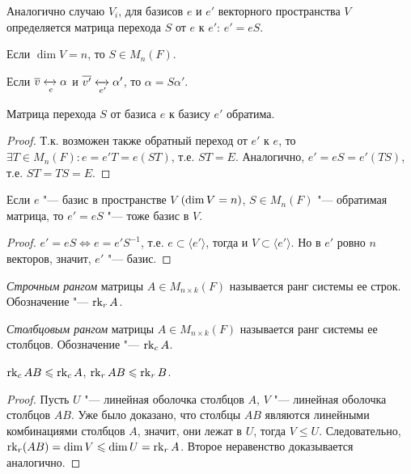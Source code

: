 \begin{note}
	Аналогично случаю $V_i$, для базисов $e$ и $e'$ векторного пространства $V$ определяется матрица перехода $S$ от $e$ к $e'$: $e' = eS$.
	
	Если $\dim{V} = n$, то $S \in M_{n}(F)$.
	
	Если $\overline{v} \xleftrightarrow[e]{} \alpha$ и $\overline{v'} \xleftrightarrow[e']{} \alpha'$, то $\alpha = S\alpha'$.
\end{note}

\begin{proposition}
	Матрица перехода $S$ от базиса $e$ к базису $e'$ обратима.
\end{proposition}

\begin{proof}
	Т.\:к. возможен также обратный переход от $e'$ к $e$, то $\exists T \in M_n(F): e = e'T = e(ST)$, т.\:е. $ST = E$. Аналогично, $e' = eS = e'(TS)$, т.\:е. $ST = TS = E$.
\end{proof}

\begin{proposition}
	Если $e$ "--- базис в пространстве $V$ $(\dim{V} \hm{=} n)$, $S \in M_n(F)$ "--- обратимая матрица, то $e' = eS$ "--- тоже базис в $V$.
\end{proposition}

\begin{proof}
	$e' = eS \Leftrightarrow e = e'S^{-1}$, т.\:е. $e \subset \langle e'\rangle$, тогда и $V \subset \langle e'\rangle$. Но в $e'$ ровно $n$ векторов, значит, $e'$ "--- базис.
\end{proof}

\begin{definition}
	\textit{Строчным рангом} матрицы $A \in M_{n \times k}(F)$ называется ранг системы ее строк. Обозначение "--- $\operatorname{rk}_{r}{A}$.
\end{definition}

\begin{definition}
	\textit{Столбцовым рангом} матрицы $A \in M_{n \times k}(F)$ называется ранг системы ее столбцов. Обозначение "--- $\operatorname{rk}_{c}{A}$.
\end{definition}

\begin{proposition}
	$\operatorname{rk}_c{AB} \leqslant \operatorname{rk}_cA$, $\operatorname{rk}_r{AB} \leqslant \operatorname{rk}_rB$.
\end{proposition}

\begin{proof}
	Пусть $U$ "--- линейная оболочка столбцов $A$, $V$ "--- линейная оболочка столбцов $AB$. Уже было доказано, что столбцы $AB$ являются линейными комбинациями столбцов $A$, значит, они лежат в $U$, тогда $V \le U$. Следовательно, $\rk_r(AB) = \dim{V} \le \dim{U} \hm{=} \rk_rA$. Второе неравенство доказывается аналогично.
\end{proof}

